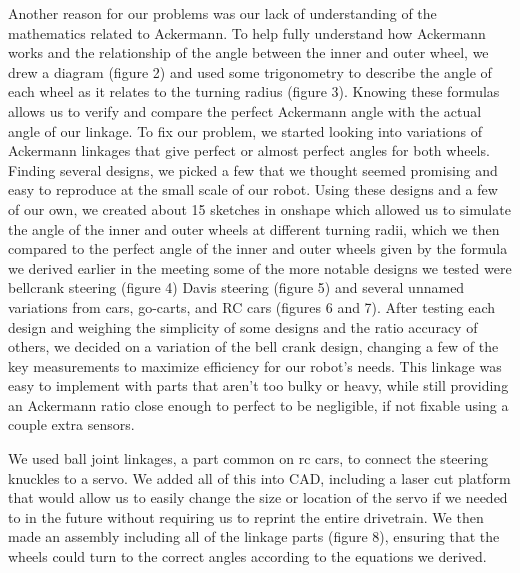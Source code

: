 Another reason for our problems was our lack of understanding of the mathematics related to Ackermann. To help fully understand how Ackermann works and the relationship of the angle between the inner and outer wheel, we drew a diagram (figure 2) and used some trigonometry to describe the angle of each wheel as it relates to the turning radius (figure 3). Knowing these formulas allows us to verify and compare the perfect Ackermann angle with the actual angle of our linkage.
To fix our problem, we started looking into variations of Ackermann linkages that give perfect or almost perfect angles for both wheels. Finding several designs, we picked a few that we thought seemed promising and easy to reproduce at the small scale of our robot. Using these designs and a few of our own, we created about 15 sketches in onshape which allowed us to simulate the angle of the inner and outer wheels at different turning radii, which we then compared to the perfect angle of the inner and outer wheels given by the formula we derived earlier in the meeting some of the more notable designs we tested were bellcrank steering (figure 4) Davis steering (figure 5) and several unnamed variations from cars, go-carts, and RC cars (figures 6 and 7). After testing each design and weighing the simplicity of some designs and the ratio accuracy of others, we decided on a variation of the bell crank design, changing a few of the key measurements to maximize efficiency for our robot’s needs. This linkage was easy to implement with parts that aren’t too bulky or heavy, while still providing an Ackermann ratio close enough to perfect to be negligible, if not fixable using a couple extra sensors. 

We used ball joint linkages, a part common on rc cars, to connect the steering knuckles to a servo. We added all of this into CAD, including a laser cut platform that would allow us to easily change the size or location of the servo if we needed to in the future without requiring us to reprint the entire drivetrain. We then made an assembly including all of the linkage parts (figure 8), ensuring that the wheels could turn to the correct angles according to the equations we derived. 



